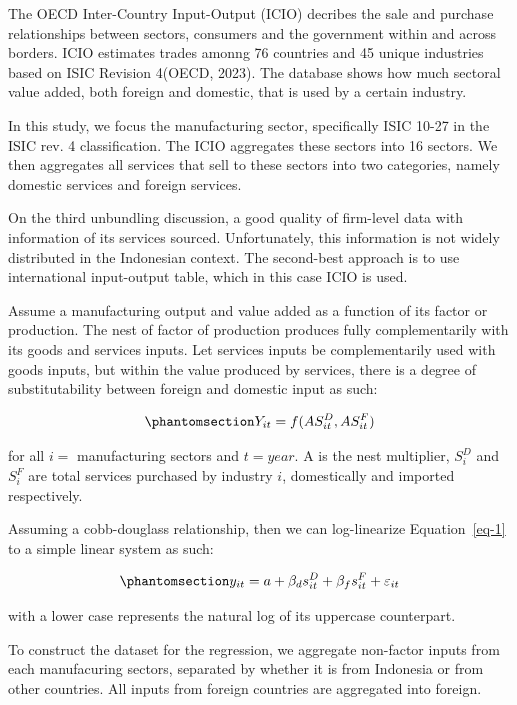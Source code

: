 \documentclass[
  letterpaper,
  DIV=11,
  numbers=noendperiod]{scrartcl}
\begin{document}
The OECD Inter-Country Input-Output (ICIO) decribes the sale and
purchase relationships between sectors, consumers and the government
within and across borders. ICIO estimates trades amonng 76 countries and
45 unique industries based on ISIC Revision 4(OECD, 2023). The database
shows how much sectoral value added, both foreign and domestic, that is
used by a certain industry.

In this study, we focus the manufacturing sector, specifically ISIC
10-27 in the ISIC rev. 4 classification. The ICIO aggregates these
sectors into 16 sectors. We then aggregates all services that sell to
these sectors into two categories, namely domestic services and foreign
services.

On the third unbundling discussion, a good quality of firm-level data
with information of its services sourced. Unfortunately, this
information is not widely distributed in the Indonesian context. The
second-best approach is to use international input-output table, which
in this case ICIO is used.

Assume a manufacturing output and value added as a function of its
factor or production. The nest of factor of production produces fully
complementarily with its goods and services inputs. Let services inputs
be complementarily used with goods inputs, but within the value produced
by services, there is a degree of substitutability between foreign and
domestic input as such:

\begin{equation}\phantomsection\label{eq-1}{
Y_{it}=f(AS^D_{it},AS^F_{it})
}\end{equation}

for all \(i=\) manufacturing sectors and \(t=year\). A is the nest
multiplier, \(S^D_i\) and \(S^F_i\) are total services purchased by
industry \(i\), domestically and imported respectively.

Assuming a cobb-douglass relationship, then we can log-linearize
Equation~\ref{eq-1} to a simple linear system as such:

\begin{equation}\phantomsection\label{eq-2}{
y_{it}=a+\beta_d s^D_{it}+\beta_f s^F_{it}+\varepsilon_{it}
}\end{equation}

with a lower case represents the natural log of its uppercase
counterpart.

To construct the dataset for the regression, we aggregate non-factor
inputs from each manufacuring sectors, separated by whether it is from
Indonesia or from other countries. All inputs from foreign countries are
aggregated into foreign.
\end{document}
